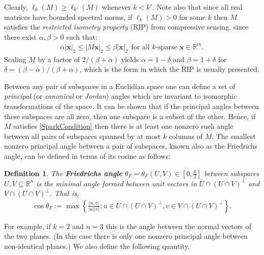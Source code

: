 \documentclass[journal, onecolumn]{IEEEtran}
\newtheorem{definition}{Definition}
\begin{document}
Clearly, $\ell_{k}(M) \geq \ell_{k'}(M)$ whenever $k < k'$. Note also that since all real matrices have bounded spectral norms, if $\ell_k(M) > 0$ for some $k$ then $M$ satisfies the \emph{restricted isometry property} (RIP) \cite{CandesTao05} from compressive sensing, since there exist $\alpha, \beta > 0$ such that:
\begin{align}
\alpha|\mathbf{x}|_2 \leq |M\mathbf{x}|_2 \leq \beta|\mathbf{x}|_2 \ \ \text{for all $k$-sparse } \mathbf{x} \in \mathbb{R}^m.
\end{align}
%
Scaling $M$ by a factor of $2/(\beta + \alpha)$ yields $\alpha = 1-\delta$ and $\beta = 1+\delta$ for $\delta = (\beta - \alpha)/(\beta + \alpha)$, which is the form in which the RIP is usually presented.

Between any pair of subspaces in a Euclidian space one can define a set of \textit{principal} (or \textit{canonical} or \textit{Jordan}) angles which are invariant to isomorphic transformations of the space. It can be shown that if the principal angles between these subspaces are all zero, then one subspace is a subset of the other. Hence, if $M$ satisfies \eqref{SparkCondition} then there is at least one nonzero such angle between all pairs of subspaces spanned by at most $k$ columns of $M$. The smallest nonzero principal angle between a pair of subspaces, known also as the Friedrichs angle, can be defined in terms of its cosine as follows:

\begin{definition}\label{FriedrichsDefinition}
The \textbf{Friedrichs angle} $\theta_F = \theta_F(U,V) \in [0,\frac{\pi}{2}]$ between subspaces $U,V \subseteq \mathbb{R}^n$ is the minimal angle formed between unit vectors in $U \cap (U \cap V)^\perp$ and $V \cap (U \cap V)^\perp$. That is,
\begin{align}
\cos{\theta_F} := \max\left\{ \frac{ \langle u, v \rangle }{|u||v|}: u \in U \cap (U \cap V)^\perp, v \in V \cap (U \cap V)^\perp \right\}.
\end{align}
\end{definition}

For example, if $k=2$ and $n=3$ this is the angle between the normal vectors of the two planes. (In this case there is only one nonzero principal angle between non-identical planes.) We also define the following quantity.
\end{document}
